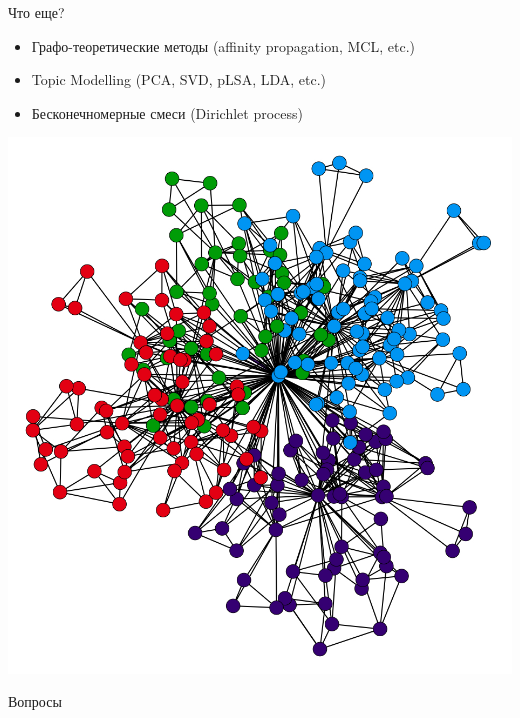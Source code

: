 \documentclass[10pt]{beamer}
\begin{document}
\begin{frame}{Что еще?}

\begin{itemize}
\item Графо-теоретические методы (affinity propagation, MCL, etc.)
\item Topic Modelling (PCA, SVD, pLSA, LDA, etc.)
\item Бесконечномерные смеси (Dirichlet process)
\end{itemize}

\begin{center}
\includegraphics[height=0.6\textheight]{images/graph.jpg}
\end{center}

\end{frame}

\begin{frame}[plain]
\begin{center}
{\Large Вопросы}
\end{center}
\end{frame}
\end{document}
